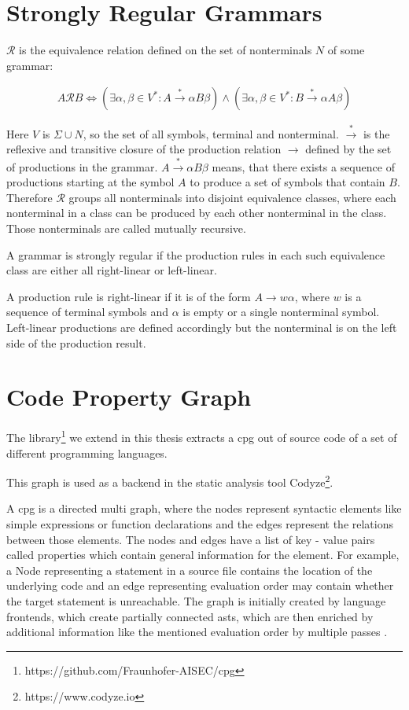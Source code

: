 \section{Strongly Regular Grammars}\label{sec:background:srg}

$\mathcal{R}$ is the equivalence relation defined on the set of nonterminals $N$ of some grammar:

\begin{align}
	A \mathcal{R} B \Leftrightarrow (\exists \alpha, \beta \in V^* : A \xrightarrow{*} \alpha B \beta) \land (\exists \alpha, \beta \in V^* : B \xrightarrow{*} \alpha A \beta) 
\end{align}

Here $V$ is $\Sigma \cup N$, so the set of all symbols, terminal and nonterminal. $\xrightarrow{*}$ is the reflexive and transitive closure of the production relation $\rightarrow$ defined by the set of productions in the grammar. $A \xrightarrow{*} \alpha B \beta$ means, that there exists a sequence of productions starting at the symbol $A$ to produce a set of symbols that contain $B$. Therefore $\mathcal{R}$ groups all nonterminals into disjoint equivalence classes, where each nonterminal in a class can be produced by each other nonterminal in the class. Those nonterminals are called mutually recursive.

A grammar is strongly regular if the production rules in each such equivalence class are either all right-linear or left-linear.

A production rule is right-linear if it is of the form $A \rightarrow w \alpha$, where $w$ is a sequence of terminal symbols and $\alpha$ is empty or a single nonterminal symbol. Left-linear productions are defined accordingly but the nonterminal is on the left side of the production result.


\section{Code Property Graph}
The library\footnote{https://github.com/Fraunhofer-AISEC/cpg} we extend in this thesis extracts a \acf{cpg} out of source code of a set of different programming languages.

This graph is used as a backend in the static analysis tool Codyze\footnote{https://www.codyze.io}.

A \ac{cpg} is a directed multi graph, where the nodes represent syntactic elements like simple expressions or function declarations and the edges represent the relations between those elements. The nodes and edges have a list of key - value pairs called properties which contain general information for the element. For example, a Node representing a statement in a source file contains the location of the underlying code and an edge representing evaluation order may contain whether the target statement is unreachable. The graph is initially created by language frontends, which create partially connected \acp{ast}, which are then enriched by additional information like the mentioned evaluation order by multiple passes \cite{cpg}.

